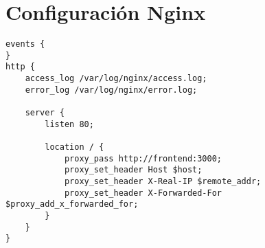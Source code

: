 \section{Configuración Nginx}
\begin{lstlisting}[label=cod:nginx-config,caption=Configuración reverse proxy nginx.] 
events {
}
http {
    access_log /var/log/nginx/access.log;
    error_log /var/log/nginx/error.log;

    server {
        listen 80;

        location / {
            proxy_pass http://frontend:3000;
            proxy_set_header Host $host;
            proxy_set_header X-Real-IP $remote_addr;
            proxy_set_header X-Forwarded-For $proxy_add_x_forwarded_for;
        }
    }
}

\end{lstlisting}
